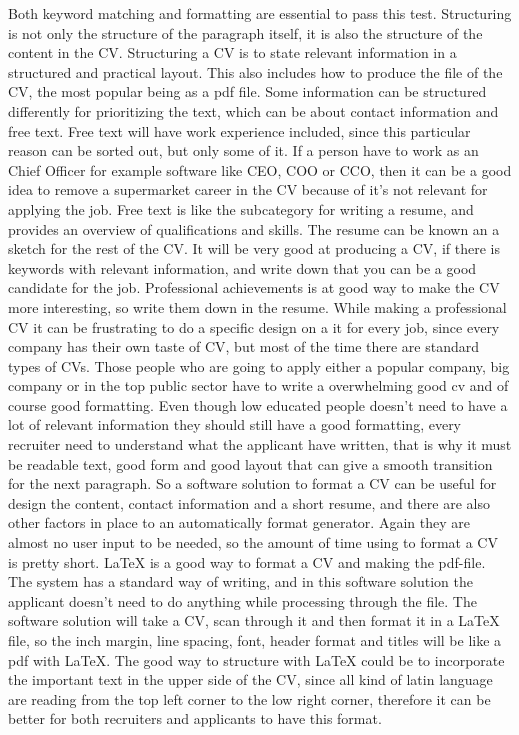 Both keyword matching and formatting are essential to pass this test.
Structuring is not only the structure of the paragraph itself, it is also the structure of the content in the CV.
Structuring a CV is to state relevant information in a structured and practical layout. 
This also includes how to produce the file of the CV, the most popular being as a pdf file.
Some information can be structured differently for prioritizing the text, which can be about contact information and free text.
Free text will have work experience included, since this particular reason can be sorted out, but only some of it. 
If a person have to work as an Chief Officer for example software like CEO, COO or CCO, 
then it can be a good idea to remove a supermarket career in the CV because of it's not relevant for applying the job. 
Free text is like the subcategory for writing a resume,
and provides an overview of qualifications and skills. The resume can be known an a sketch for the rest of the CV. 
It will be very good at producing a CV, if there is keywords with relevant information, 
and write down that you can be a good candidate for the job.
Professional achievements is at good way to make the CV more interesting, so write them down in the resume.
While making a professional CV it can be frustrating to do a specific design on a it for every job, 
since every company has their own taste of CV, but most of the time there are standard types of CVs. 
Those people who are going to apply either a popular company, big company or
in the top public sector have to write a overwhelming good cv and of course good formatting.
Even though low educated people doesn't need to have a lot of relevant information they should still have a good formatting, 
every recruiter need to understand what the applicant have written, that is why it must be readable text, good form 
and good layout that can give a smooth transition for the next paragraph. 
So a software solution to format a CV can be useful for design the content, contact information and a short resume,
and there are also other factors in place to an automatically format generator. Again they are almost no user input to be needed, 
so the amount of time using to format a CV is pretty short. 
LaTeX is a good way to format a CV and making the pdf-file. The system has a standard way of writing, and in this software solution
the applicant doesn't need to do anything while processing through the file. The software solution will take a CV, scan through it and
then format it in a LaTeX file, so the inch margin, line spacing, font, header format and titles 
will be like a pdf with LaTeX. 
The good way to structure with LaTeX could be to incorporate the important text in the upper side of the CV, 
since all kind of latin language are reading from the top left corner to the low right corner, therefore it can be better
for both recruiters and applicants to have this format.

